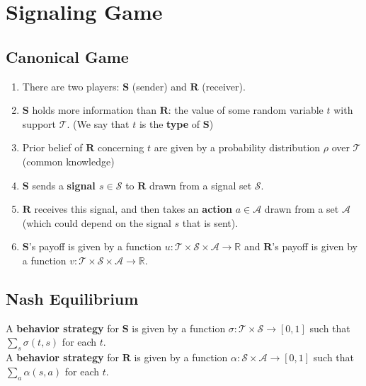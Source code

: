 \documentclass[11pt]{elegantbook}
\begin{document}
\section{Signaling Game}
\subsection{Canonical Game}
\begin{definition}
    \normalfont
    \begin{enumerate}
        \item There are two players: $\mathbf{S}$ (sender) and $\mathbf{R}$ (receiver).
        \item $\mathbf{S}$ holds more information than $\mathbf{R}$: the value of some random variable $t$ with support $\mathcal{T}$. (We say that $t$ is the \textbf{type} of $\mathbf{S}$)
        \item Prior belief of $\mathbf{R}$ concerning $t$ are given by a probability distribution $\rho$ over $\mathcal{T}$ (common knowledge)
        \item $\mathbf{S}$ sends a \textbf{signal $s\in \mathcal{S}$} to $\mathbf{R}$ drawn from a signal set $\mathcal{S}$.
        \item $\mathbf{R}$ receives this signal, and then takes an \textbf{action} $a\in \mathcal{A}$ drawn from a set $\mathcal{A}$ (which could depend on the signal $s$ that is sent).
        \item $\mathbf{S}$'s payoff is given by a function $u: \mathcal{T}\times \mathcal{S} \times \mathcal{A} \rightarrow \mathbb{R}$ and $\mathbf{R}$'s payoff is given by a function $v: \mathcal{T}\times \mathcal{S} \times \mathcal{A} \rightarrow \mathbb{R}$.
    \end{enumerate}
\end{definition}

\subsection{Nash Equilibrium}
\begin{definition}[Strategy]
    \normalfont
    A \textbf{behavior strategy} for $\mathbf{S}$ is given by a function $\sigma: \mathcal{T}\times\mathcal{S} \rightarrow [0,1]$ such that $\sum_s \sigma(t,s)$ for each $t$.\\
    A \textbf{behavior strategy} for $\mathbf{R}$ is given by a function $\alpha: \mathcal{S}\times\mathcal{A} \rightarrow [0,1]$ such that $\sum_a \alpha(s,a)$ for each $t$.
\end{definition}
\end{document}
